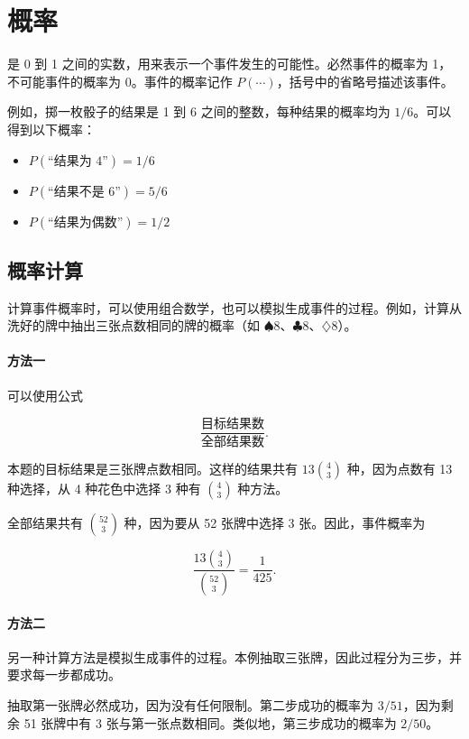 \chapter{概率}


是 0 到 1 之间的实数，用来表示一个事件发生的可能性。必然事件的概率为 1，不可能事件的概率为 0。事件的概率记作 $P(\cdots)$，括号中的省略号描述该事件。

例如，掷一枚骰子的结果是 1 到 6 之间的整数，每种结果的概率均为 $1/6$。可以得到以下概率：

\begin{itemize}[noitemsep]
\item $P(\textrm{“结果为 4”})=1/6$
\item $P(\textrm{“结果不是 6”})=5/6$
\item $P(\textrm{“结果为偶数”})=1/2$
\end{itemize}

\section{概率计算}

计算事件概率时，可以使用组合数学，也可以模拟生成事件的过程。例如，计算从洗好的牌中抽出三张点数相同的牌的概率（如 $\spadesuit 8$、$\clubsuit 8$、$\diamondsuit 8$）。

\subsubsection*{方法一}

可以使用公式

\[\frac{\textrm{目标结果数}}{\textrm{全部结果数}}.\]

本题的目标结果是三张牌点数相同。这样的结果共有 $13 {4 \choose 3}$ 种，因为点数有 13 种选择，从 4 种花色中选择 3 种有 ${4 \choose 3}$ 种方法。

全部结果共有 ${52 \choose 3}$ 种，因为要从 52 张牌中选择 3 张。因此，事件概率为

\[\frac{13 {4 \choose 3}}{{52 \choose 3}} = \frac{1}{425}.\]

\subsubsection*{方法二}

另一种计算方法是模拟生成事件的过程。本例抽取三张牌，因此过程分为三步，并要求每一步都成功。

抽取第一张牌必然成功，因为没有任何限制。第二步成功的概率为 $3/51$，因为剩余 51 张牌中有 3 张与第一张点数相同。类似地，第三步成功的概率为 $2/50$。


